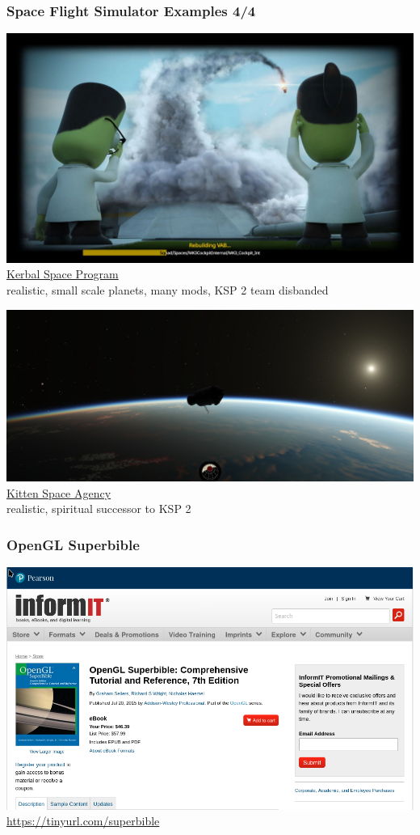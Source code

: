 \documentclass[aspectratio=169,11pt,xcolor=dvipsnames]{beamer}
\begin{document}
\begin{frame}
  \frametitle{Space Flight Simulator Examples 4/4}
  \begin{minipage}[t]{0.49\textwidth}
    \begin{center}
      \includegraphics[width=\textwidth]{ksp}\\
      \href{https://www.kerbalspaceprogram.com/}{Kerbal Space Program}\\
      realistic, small scale planets, many mods, KSP 2 team disbanded
    \end{center}
  \end{minipage}
  \begin{minipage}[t]{0.49\textwidth}
    \begin{center}
      \includegraphics[width=\textwidth]{ksa}\\
      \href{https://rocketwerkz.com/}{Kitten Space Agency}\\
      realistic, spiritual successor to KSP 2
    \end{center}
  \end{minipage}
\end{frame}

\begin{frame}
  \frametitle{OpenGL Superbible}
  \begin{center}
    \includegraphics[width=.35\textwidth]{superbible}\\
    \url{https://tinyurl.com/superbible}
  \end{center}
\end{frame}
\end{document}
